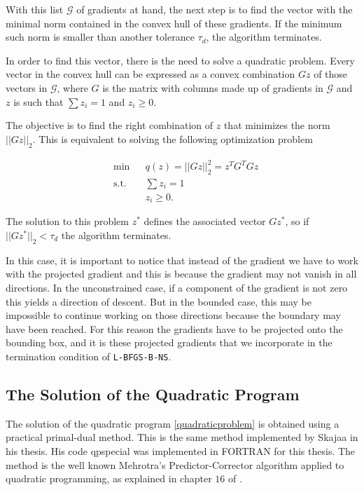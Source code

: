 With this list $\mathcal{G}$ of gradients at hand, the next step is to find the vector with the minimal norm contained in the convex hull of these gradients. If the minimum such norm is smaller than another tolerance $\tau_d$, the algorithm terminates.

In order to find this vector, there is the need to solve a quadratic problem. Every vector in the convex hull can be expressed as a convex combination $Gz$ of those vectors in $\mathcal{G}$, where $G$ is the matrix with columns made up of gradients in $\mathcal{G}$ and $z$ is such that $\sum z_i = 1$ and $z_i \geq 0$.

The objective is to find the right combination of $z$ that minimizes the norm $||Gz||_2$.  This is equivalent to solving the following optimization problem

\begin{equation} \label{quadraticproblem}
  \begin{aligned}
    & {\text{min}}
    & & q(z) = ||G z ||_2^2 = z^TG^TGz  \\
    & \text{s.t.}
    & & \sum z_i = 1 \; \\
    & & & z_i \geq 0.
  \end{aligned}
\end{equation}

The solution to this problem $z^*$ defines the associated vector $Gz^*$, so if $||Gz^*||_2 < \tau_d$ the algorithm terminates.

In this case, it is important to notice that instead of the gradient we have to work with the projected gradient and this is because the gradient may not vanish in all directions. In the unconstrained case, if a component of the gradient is not zero this yields a direction of descent. But in the bounded case, this may be impossible to continue working on those directions because the boundary may have been reached. For this reason the gradients have to be projected onto the bounding box, and it is these projected gradients that we incorporate in the termination condition of \texttt{L-BFGS-B-NS}.

\subsection{The Solution of the Quadratic Program}

The solution of the quadratic program \eqref{quadraticproblem} is obtained using a practical primal-dual method. This is the same method implemented by Skajaa \citep{skajaa} in his thesis. His code \textsf{qpspecial} was implemented in \textsc{FORTRAN} for this thesis. The method is the well known Mehrotra's Predictor-Corrector algorithm applied to quadratic programming, as explained in chapter $16$ of \citep{nocedal}.

